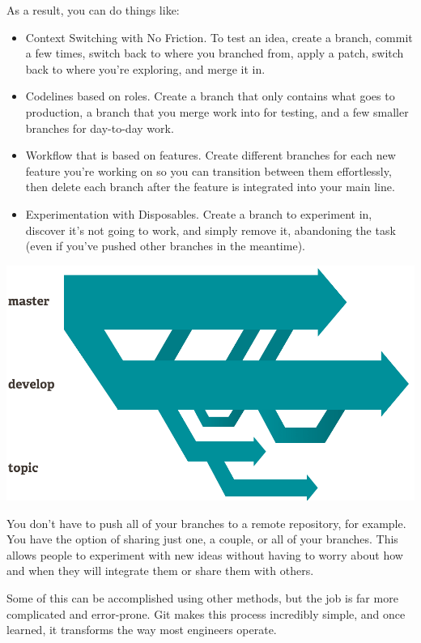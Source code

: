 \tab As a result, you can do things like:

\begin{itemize}
    \item Context Switching with No Friction. To test an idea, create a branch, commit a few times, switch back to where you branched from, apply a patch, switch back to where you're exploring, and merge it in.
    \item Codelines based on roles. Create a branch that only contains what goes to production, a branch that you merge work into for testing, and a few smaller branches for day-to-day work.
    \item Workflow that is based on features. Create different branches for each new feature you're working on so you can transition between them effortlessly, then delete each branch after the feature is integrated into your main line.
    \item Experimentation with Disposables. Create a branch to experiment in, discover it's not going to work, and simply remove it, abandoning the task (even if you've pushed other branches in the meantime).
\end{itemize}

\begin{center}
\includegraphics[width=400pt]{git.png} 
\end{center}

\tab You don't have to push all of your branches to a remote repository, for example. You have the option of sharing just one, a couple, or all of your branches. This allows people to experiment with new ideas without having to worry about how and when they will integrate them or share them with others.

\tab Some of this can be accomplished using other methods, but the job is far more complicated and error-prone. Git makes this process incredibly simple, and once learned, it transforms the way most engineers operate.